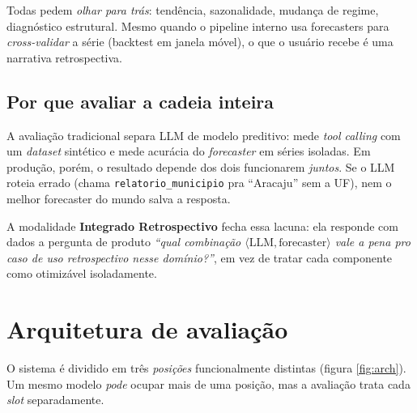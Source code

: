 \documentclass[11pt,a4paper]{article}
\newcommand{\code}[1]{\texttt{\small #1}}
\begin{document}
Todas pedem \emph{olhar para trás}: tendência, sazonalidade, mudança de
regime, diagnóstico estrutural. Mesmo quando o pipeline interno usa
forecasters para \emph{cross-validar} a série (backtest em janela móvel),
o que o usuário recebe é uma narrativa retrospectiva.

\subsection{Por que avaliar a cadeia inteira}

A avaliação tradicional separa LLM de modelo preditivo: mede \emph{tool
calling} com um \emph{dataset} sintético e mede acurácia do \emph{forecaster}
em séries isoladas. Em produção, porém, o resultado depende dos dois
funcionarem \emph{juntos}. Se o LLM roteia errado (chama
\code{relatorio\_municipio} pra ``Aracaju'' sem a UF), nem o melhor
forecaster do mundo salva a resposta.

A modalidade \textbf{Integrado Retrospectivo} fecha essa lacuna: ela
responde com dados a pergunta de produto \emph{``qual combinação
\(\langle \text{LLM}, \text{forecaster} \rangle\) vale a pena pro caso
de uso retrospectivo nesse domínio?''}, em vez de tratar cada componente
como otimizável isoladamente.

\section{Arquitetura de avaliação}

O sistema é dividido em três \emph{posições} funcionalmente distintas
(figura \ref{fig:arch}). Um mesmo modelo \emph{pode} ocupar mais de uma
posição, mas a avaliação trata cada \emph{slot} separadamente.
\end{document}
